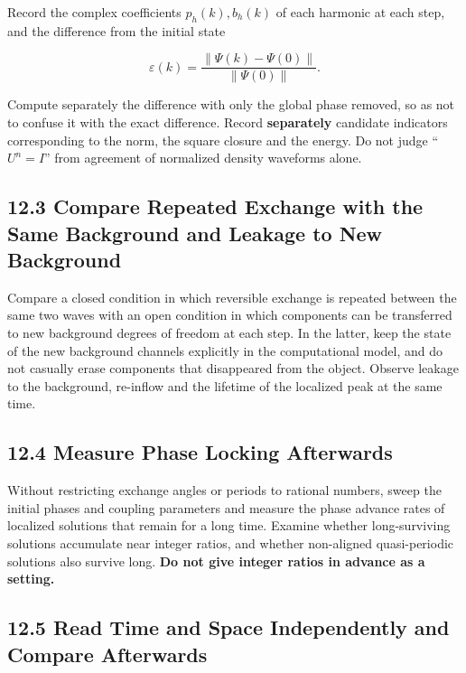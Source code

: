 \documentclass[
  a4paper,
]{article}
\begin{document}
Record the complex coefficients \(p_h(k),b_h(k)\) of each harmonic at
each step, and the difference from the initial state

\[
\varepsilon(k)=
\frac{\|\Psi(k)-\Psi(0)\|}{\|\Psi(0)\|}.
\]

Compute separately the difference with only the global phase removed, so
as not to confuse it with the exact difference. Record
\textbf{separately} candidate indicators corresponding to the norm, the
square closure and the energy. Do not judge ``\(U^n=I\)'' from agreement
of normalized density waveforms alone.

\subsection{12.3 Compare Repeated Exchange with the Same Background and
Leakage to New
Background}\label{compare-repeated-exchange-with-the-same-background-and-leakage-to-new-background}

Compare a closed condition in which reversible exchange is repeated
between the same two waves with an open condition in which components
can be transferred to new background degrees of freedom at each step. In
the latter, keep the state of the new background channels explicitly in
the computational model, and do not casually erase components that
disappeared from the object. Observe leakage to the background,
re-inflow and the lifetime of the localized peak at the same time.

\subsection{12.4 Measure Phase Locking
Afterwards}\label{measure-phase-locking-afterwards}

Without restricting exchange angles or periods to rational numbers,
sweep the initial phases and coupling parameters and measure the phase
advance rates of localized solutions that remain for a long time.
Examine whether long-surviving solutions accumulate near integer ratios,
and whether non-aligned quasi-periodic solutions also survive long.
\textbf{Do not give integer ratios in advance as a setting.}

\subsection{12.5 Read Time and Space Independently and Compare
Afterwards}\label{read-time-and-space-independently-and-compare-afterwards}
\end{document}
